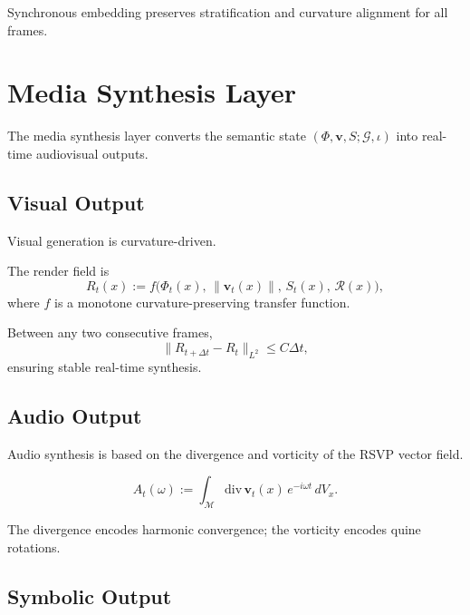 \begin{theorem}
Synchronous embedding preserves stratification and curvature alignment for all
frames.
\end{theorem}


\section{Media Synthesis Layer}
\label{sec:53:media-synthesis}

The media synthesis layer converts the semantic state
$(\Phi,\mathbf{v},S;\mathcal{G},\iota)$ into real-time audiovisual outputs.

\subsection{Visual Output}

Visual generation is curvature-driven.

\begin{definition}
The render field is
\[
R_t(x) :=
f\bigl(\Phi_t(x),\,\|\mathbf{v}_t(x)\|,\,S_t(x),\,\mathcal{R}(x)\bigr),
\]
where $f$ is a monotone curvature-preserving transfer function.
\end{definition}

\begin{theorem}
Between any two consecutive frames,
\[
\|R_{t+\Delta t} - R_t\|_{L^2} \le C \Delta t,
\]
ensuring stable real-time synthesis.
\end{theorem}


\subsection{Audio Output}

Audio synthesis is based on the divergence and vorticity of the RSVP vector
field.

\begin{definition}
\[
A_t(\omega) :=
\int_{\mathcal{M}} 
\mathrm{div}\,\mathbf{v}_t(x)\,
e^{-i\omega t} \, dV_x.
\]
\end{definition}

The divergence encodes harmonic convergence; the vorticity encodes quine
rotations.


\subsection{Symbolic Output}

